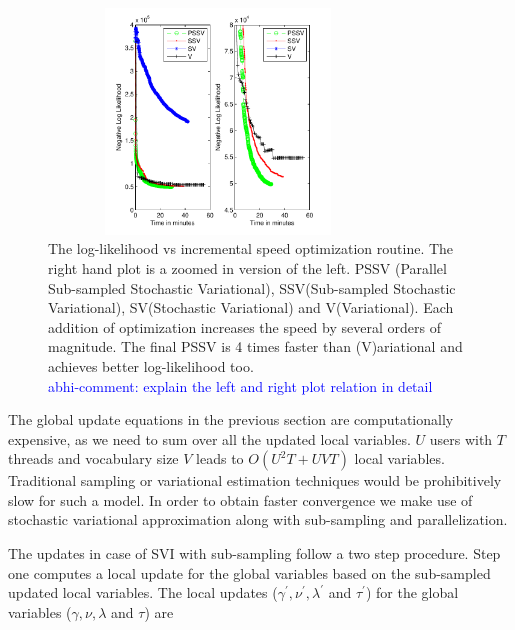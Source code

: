\documentclass{sig-alternate}
\newcommand{\abhi}[1]{\textcolor{blue}{\\ abhi-comment: #1}}
\begin{document}
\begin{figure}
\begin{center}
\includegraphics[height=6cm,width=9cm]{SpeedOptimization.pdf}
\end{center}
\caption{\small{The log-likelihood vs incremental speed optimization routine. 
The right hand plot is a zoomed in version of the left. PSSV
(Parallel Sub-sampled Stochastic Variational), SSV(Sub-sampled Stochastic
Variational), SV(Stochastic Variational) and V(Variational). Each addition of
optimization increases the speed by several orders of magnitude. The final PSSV
is 4 times faster than (V)ariational and achieves better log-likelihood too.
\abhi{explain the left and right plot relation in detail}}}
\label{fig:SpeedOptimization}
\end{figure}
The global update equations in the previous section are computationally
expensive, as we need to sum over all the updated local
variables. $U$ users with $T$ threads and vocabulary size $V$ leads to
$O(U^2T+UVT)$ local variables. Traditional sampling or 
variational estimation techniques would be prohibitively slow for such a model. In order to obtain faster convergence we
make use of stochastic variational approximation along with sub-sampling and parallelization. 

The updates in case of SVI with sub-sampling follow a two step procedure. Step
one computes a local update for the global variables based on the sub-sampled
updated local variables. The local updates ($\gamma^{'},
\nu^{'}, \lambda^{'}$ and $\tau^{'}$) for the global variables ($\gamma,
\nu, \lambda$ and $\tau$) are
\end{document}

